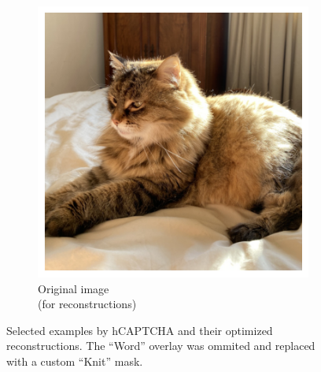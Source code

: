 \documentclass[a4paper, oneside]{discothesis}
\begin{document}
\begin{figure}[th]
	\hfill
	\begin{subfigure}[t]{0.19\textwidth}\centering\includegraphics[width=\linewidth]{figures/hcaptcha-copy-original.png}\caption{Original image\\(for reconstructions)}\label{fig:subfig9}\end{subfigure}

	\caption{Selected examples by hCAPTCHA and their optimized reconstructions. The ``Word'' overlay was ommited and replaced with a custom ``Knit'' mask.}
	\label{fig:hcaptcha-combined}
\end{figure}
\end{document}
